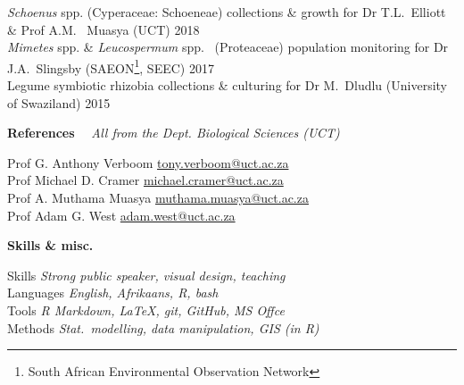\documentclass[10pt]{article}
\begin{document}
\textit{Schoenus} spp. (Cyperaceae: Schoeneae)
  collections \& growth for Dr T.L.~Elliott \& Prof A.M.~
  Muasya {\small (UCT)}                                  \hfill {\small 2018} \\
\textit{Mimetes} spp. \& \textit{Leucospermum} spp.~
  (Proteaceae) population monitoring for Dr J.A.~Slingsby
  {\small (SAEON\footnote{South African Environmental
  Observation Network}, SEEC)}                           \hfill {\small 2017} \\
Legume symbiotic rhizobia collections \& culturing for
  Dr M.~Dludlu {\small (University of Swaziland)}        \hfill {\small 2015}

\begin{multicols}{2}

\textbf{References} %
  ~~{\small \textmd{\textit{All from the Dept. Biological Sciences (UCT)}}}

Prof G. Anthony Verboom
      \hfill     \href{mailto:tony.verboom@uct.ac.za}{tony.verboom@uct.ac.za} \\
Prof Michael D. Cramer
      \hfill \href{mailto:michael.cramer@uct.ac.za}{michael.cramer@uct.ac.za} \\
Prof A. Muthama Muasya
      \hfill \href{mailto:muthama.muasya@uct.ac.za}{muthama.muasya@uct.ac.za} \\
Prof Adam G. West
      \hfill           \href{mailto:adam.west@uct.ac.za}{adam.west@uct.ac.za}

\columnbreak

\textbf{Skills \& misc.} %


Skills         \hfill \textit{Strong public speaker, visual design, teaching} \\
Languages      \hfill \textit{                   English, Afrikaans, R, bash} \\
Tools          \hfill \textit{      R Markdown, LaTeX, git, GitHub, MS Offce} \\
Methods        \hfill \textit{Stat.~modelling, data manipulation, GIS (in R)}

\end{multicols}
\end{document}
